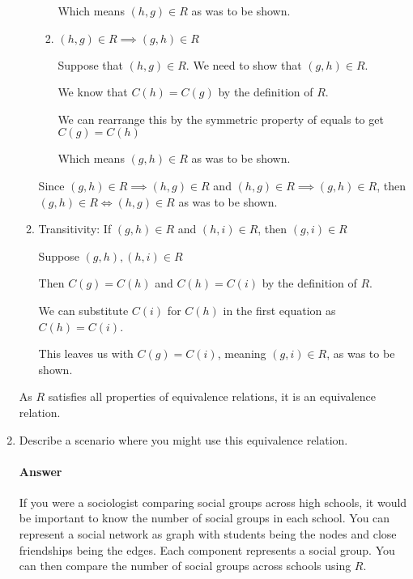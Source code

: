 \documentclass{article}
\begin{document}
\begin{enumerate}
\begin{enumerate}
\begin{enumerate}
       Which means $(h, g) \in R$ as was to be shown.
       
       \item $(h, g) \in R \implies (g, h) \in R$
       
       Suppose that $(h, g) \in R$. We need to show that $(g, h) \in R$.
        
        We know that $C(h) = C(g)$ by the definition of $R$.
        
        We can rearrange this by the symmetric property of equals to get $C(g) = C(h)$
       
       Which means $(g, h) \in R$ as was to be shown.
        \end{enumerate}
        Since $(g, h) \in R \implies (h, g) \in R$ and $(h, g) \in R \implies (g, h) \in R$, then $(g, h) \in R \iff (h, g) \in R$ as was to be shown.
        
        \item Transitivity: If $(g, h) \in R$ and $(h, i) \in R$, then $(g, i) \in R$
        
        Suppose $(g, h), (h, i) \in R$
        
        Then $C(g) = C(h)$ and $C(h) = C(i)$ by the definition of $R$.
        
        We can substitute $C(i)$ for $C(h)$ in the first equation as $C(h) = C(i)$.
        
        This leaves us with $C(g) = C(i)$, meaning $(g, i) \in R$, as was to be shown.
        \end{enumerate}
        As $R$ satisfies all properties of equivalence relations, it is an equivalence relation.

    \item Describe a scenario where you might use this equivalence relation.

        \paragraph{Answer}

        If you were a sociologist comparing social groups across high schools, it would be important to know the 
        number of social groups in each school. You can represent a social network as graph with students being the nodes
        and close friendships being the edges. Each component represents a social group. You can then compare the number of
        social groups across schools using $R$.

\end{enumerate}
\end{document}

